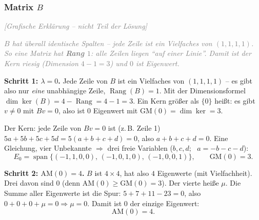 \documentclass[a4paper,12pt]{article}
\newcommand{\grafik}{\textcolor{gray}{\small\textit{[Grafische Erkl\"arung -- nicht Teil der L\"osung]}}}
\newcommand{\EW}{Eigenwert}
\begin{document}
\subsubsection*{Matrix $B$}

\grafik

\begin{center}
\end{center}

\textcolor{gray}{\small\textit{$B$ hat \"uberall identische Spalten -- jede Zeile ist ein Vielfaches von $(1,1,1,1)$. So eine Matrix hat \textbf{Rang $1$}: alle Zeilen liegen ``auf einer Linie''. Damit ist der Kern riesig (Dimension $4 - 1 = 3$) und $0$ ist \EW{}.}}

\textbf{Schritt 1: $\lambda = 0$.} Jede Zeile von $B$ ist ein Vielfaches von $(1,1,1,1)$ -- es gibt also nur \emph{eine} unabh\"angige Zeile, $\operatorname{Rang}(B) = 1$. Mit der Dimensionsformel $\dim\ker(B) = 4 - \operatorname{Rang} = 4 - 1 = 3$. Ein Kern gr\"o\ss er als $\{0\}$ hei\ss t: es gibt $v \neq 0$ mit $Bv = 0$, also ist $0$ \EW{} mit $\text{GM}(0) = \dim\ker = 3$.

Der Kern: jede Zeile von $Bv = 0$ ist (z.\,B. Zeile 1) $5a + 5b + 5c + 5d = 5(a+b+c+d) = 0$, also $a + b + c + d = 0$. Eine Gleichung, vier Unbekannte $\Rightarrow$ drei freie Variablen ($b, c, d$; \, $a = -b-c-d$):
\[
E_0 = \operatorname{span}\{(-1,1,0,0),\, (-1,0,1,0),\, (-1,0,0,1)\}, \qquad \text{GM}(0) = 3.
\]

\textbf{Schritt 2: $\text{AM}(0) = 4$.} $B$ ist $4\times4$, hat also $4$ \EW{}e (mit Vielfachheit). Drei davon sind $0$ (denn $\text{AM}(0) \ge \text{GM}(0) = 3$). Der vierte hei\ss e $\mu$. Die Summe aller \EW{}e ist die Spur: $5 + 7 + 11 - 23 = 0$, also $0 + 0 + 0 + \mu = 0 \Rightarrow \mu = 0$. Damit ist $0$ der einzige \EW{}:
\[
\text{AM}(0) = 4.
\]
\end{document}
